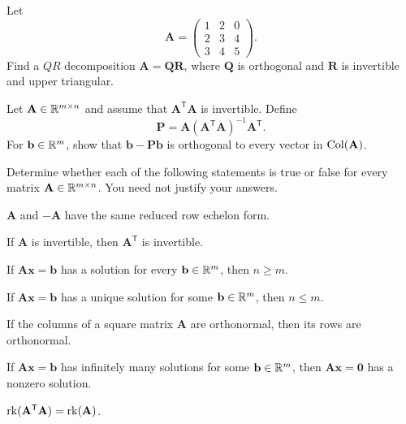 \documentclass[11pt,oneside]{article}
\begin{document}
\begin{problem}
Let
\[
\mathbf A=
\begin{pmatrix}
1&2&0\\
2&3&4\\
3&4&5
\end{pmatrix}.
\]
Find a $QR$ decomposition $\mathbf A=\mathbf Q\mathbf R$, where $\mathbf Q$ is orthogonal and $\mathbf R$ is invertible and upper triangular.
\end{problem}

\begin{problem}
Let $\mathbf A\in\mathbb{R}^{m\times n}$ and assume that $\mathbf A^{\mathsf T}\mathbf A$ is invertible. Define
\[
\mathbf P=\mathbf A(\mathbf A^{\mathsf T}\mathbf A)^{-1}\mathbf A^{\mathsf T}.
\]
For $\mathbf b\in\mathbb{R}^m$, show that $\mathbf b-\mathbf P\mathbf b$ is orthogonal to every vector in $\operatorname{Col}(\mathbf A)$.
\end{problem}

\begin{problem}
Determine whether each of the following statements is true or false for every matrix $\mathbf A\in\mathbb{R}^{m\times n}$. You need not justify your answers.
\begin{problemchoices}
\item $\mathbf A$ and $-\mathbf A$ have the same reduced row echelon form.
\item If $\mathbf A$ is invertible, then $\mathbf A^{\mathsf T}$ is invertible.
\item If $\mathbf A\mathbf x=\mathbf b$ has a solution for every $\mathbf b\in\mathbb{R}^m$, then $n\ge m$.
\item If $\mathbf A\mathbf x=\mathbf b$ has a unique solution for some $\mathbf b\in\mathbb{R}^m$, then $n\le m$.
\item If the columns of a square matrix $\mathbf A$ are orthonormal, then its rows are orthonormal.
\item If $\mathbf A\mathbf x=\mathbf b$ has infinitely many solutions for some $\mathbf b\in\mathbb{R}^m$, then $\mathbf A\mathbf x=\mathbf 0$ has a nonzero solution.
\item $\operatorname{rk}(\mathbf A^{\mathsf T}\mathbf A)=\operatorname{rk}(\mathbf A)$.
\end{problemchoices}
\end{problem}
\end{document}

